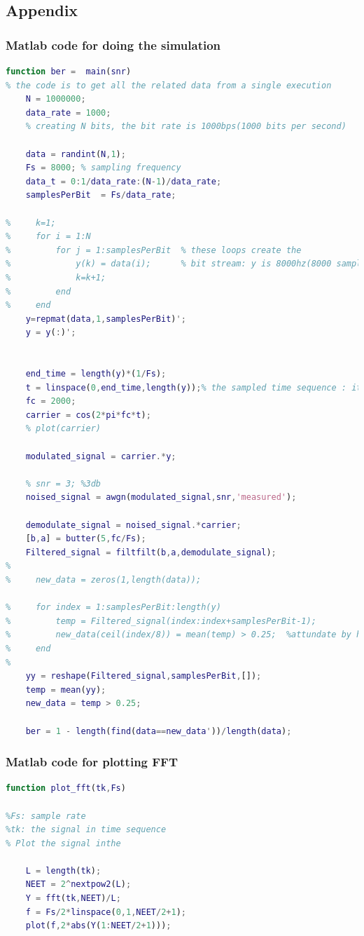 \documentclass[11pt]{scrartcl}
\begin{document}
\subsection{Appendix}
\subsubsection{Matlab code for doing the simulation}
\begin{lstlisting}[language=Matlab]
function ber =  main(snr)
% the code is to get all the related data from a single execution
    N = 1000000;
    data_rate = 1000;
    % creating N bits, the bit rate is 1000bps(1000 bits per second)

    data = randint(N,1);
    Fs = 8000; % sampling frequency
    data_t = 0:1/data_rate:(N-1)/data_rate;
    samplesPerBit  = Fs/data_rate;

%     k=1;
%     for i = 1:N
%         for j = 1:samplesPerBit  % these loops create the
%             y(k) = data(i);      % bit stream: y is 8000hz(8000 samples per second), data is 1000 samples per second
%             k=k+1;
%         end 
%     end  
    y=repmat(data,1,samplesPerBit)';
    y = y(:)';


    end_time = length(y)*(1/Fs);
    t = linspace(0,end_time,length(y));% the sampled time sequence : it is like the data_t
    fc = 2000;
    carrier = cos(2*pi*fc*t);
    % plot(carrier)

    modulated_signal = carrier.*y;

    % snr = 3; %3db
    noised_signal = awgn(modulated_signal,snr,'measured');

    demodulate_signal = noised_signal.*carrier;
    [b,a] = butter(5,fc/Fs);
    Filtered_signal = filtfilt(b,a,demodulate_signal);
% 
%     new_data = zeros(1,length(data));
    
%     for index = 1:samplesPerBit:length(y)
%         temp = Filtered_signal(index:index+samplesPerBit-1);
%         new_data(ceil(index/8)) = mean(temp) > 0.25;  %attundate by half
%     end
%     
    yy = reshape(Filtered_signal,samplesPerBit,[]);
    temp = mean(yy);
    new_data = temp > 0.25;
    
    ber = 1 - length(find(data==new_data'))/length(data);

\end{lstlisting}

\subsubsection{Matlab code for plotting FFT}

\begin{lstlisting}[language=Matlab]
function plot_fft(tk,Fs)

%Fs: sample rate
%tk: the signal in time sequence
% Plot the signal inthe 

    L = length(tk);
    NEET = 2^nextpow2(L);
    Y = fft(tk,NEET)/L;
    f = Fs/2*linspace(0,1,NEET/2+1);
    plot(f,2*abs(Y(1:NEET/2+1)));
\end{lstlisting}
\end{document}
